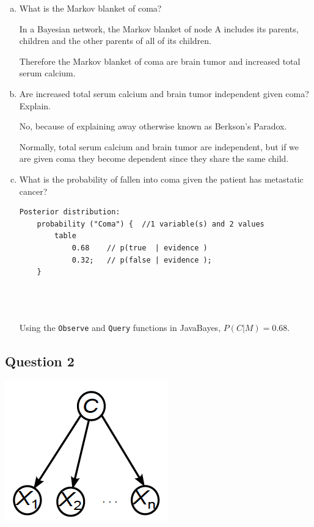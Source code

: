 \documentclass{article}
\renewcommand{\tt}{\texttt}
\begin{document}
\begin{enumerate}[a)]
\item What is the Markov blanket of coma?

In a Bayesian network, the Markov blanket of node A includes its parents, children and the other parents of all of its children.

Therefore the Markov blanket of coma are brain tumor and increased total serum calcium.

\item Are increased total serum calcium and brain tumor independent given coma? Explain.

No, because of explaining away otherwise known as Berkson's Paradox.

Normally, total serum calcium and brain tumor are independent, but if we are given coma they become dependent since they share the same child.

\item What is the probability of fallen into coma given the patient has metastatic cancer? 

\begin{minipage}{\linewidth}
\begin{lstlisting}
Posterior distribution:
	probability ("Coma") {  //1 variable(s) and 2 values
		table 
			0.68	// p(true  | evidence )
			0.32; 	// p(false | evidence );
	}
\end{lstlisting}
\end{minipage}\\
\\
\\
Using the \tt{Observe} and \tt{Query} functions in JavaBayes, $P(C | M) = 0.68$.
\end{enumerate} 

\subsection{Question 2}
\begin{minipage}{\linewidth}
\begin{center}
\includegraphics[scale=0.5]{part2_nbc}
\end{center}
\end{minipage}\\
\end{document}
